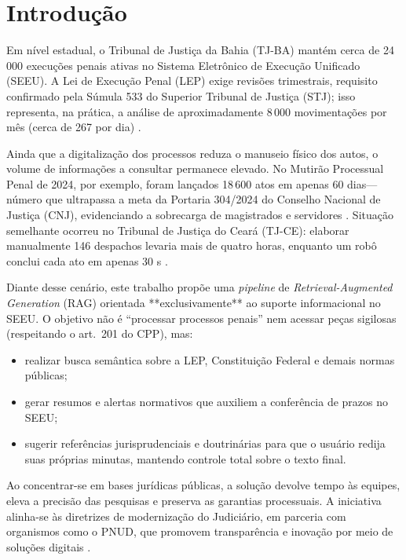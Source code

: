 
\chapter{Introdução}
\label{sec:introducao}

Em nível estadual, o Tribunal de Justiça da Bahia (TJ-BA) mantém cerca de
24\,000 execuções penais ativas no Sistema Eletrônico de Execução Unificado
(SEEU). A Lei de Execução Penal (LEP) exige revisões trimestrais, requisito
confirmado pela Súmula 533 do Superior Tribunal de Justiça (STJ); isso
representa, na prática, a análise de aproximadamente 8\,000 movimentações por
mês (cerca de 267 por dia) \cite{brasil1984lep,stj2015sumula533}.

Ainda que a digitalização dos processos reduza o manuseio físico dos autos, o
volume de informações a consultar permanece elevado. No Mutirão Processual Penal
de 2024, por exemplo, foram lançados 18\,600 atos em apenas 60 dias—número que
ultrapassa a meta da Portaria 304/2024 do Conselho Nacional de Justiça (CNJ),
evidenciando a sobrecarga de magistrados e servidores
\cite{tjba2024mutirao,cnj2024portaria304}. Situação semelhante ocorreu no
Tribunal de Justiça do Ceará (TJ-CE): elaborar manualmente 146 despachos
levaria mais de quatro horas, enquanto um robô conclui cada ato em apenas 30 s
\cite{tjce2023robos}.

Diante desse cenário, este trabalho propõe uma \emph{pipeline} de
\emph{Retrieval-Augmented Generation} (RAG) orientada **exclusivamente** ao
suporte informacional no SEEU. O objetivo não é “processar processos penais” nem
acessar peças sigilosas (respeitando o art.~201 do CPP), mas:

\begin{itemize}
  \item realizar busca semântica sobre a LEP, Constituição Federal e demais
        normas públicas;
  \item gerar resumos e alertas normativos que auxiliem a conferência de prazos
        no SEEU;
  \item sugerir referências jurisprudenciais e doutrinárias para que o usuário
        redija suas próprias minutas, mantendo controle total sobre o texto
        final.
\end{itemize}

Ao concentrar-se em bases jurídicas públicas, a solução devolve tempo às
equipes, eleva a precisão das pesquisas e preserva as garantias processuais.
A iniciativa alinha-se às diretrizes de modernização do Judiciário, em
parceria com organismos como o PNUD, que promovem transparência e inovação por
meio de soluções digitais \cite{undp2025pnudcnj}.

